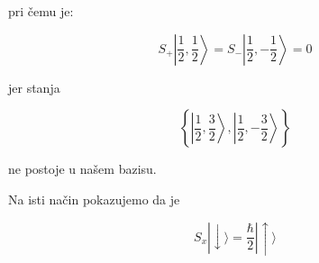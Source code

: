 pri čemu je:

\begin{equation*}
    S_+ \left |\frac{1}{2},\frac{1}{2} \right \rangle = S_- \left |\frac{1}{2},-\frac{1}{2} \right \rangle = 0
\end{equation*}

jer stanja 

\begin{equation*}
  \left \{ \left |\frac{1}{2},\frac{3}{2} \right \rangle ,  \left |\frac{1}{2},-\frac{3}{2} \right \rangle \right \}
\end{equation*}

ne postoje u našem bazisu.

Na isti način pokazujemo da je 

\begin{equation*}
    S_x | \downarrow \rangle = \frac{\hbar}{2} | \uparrow \rangle
\end{equation*}